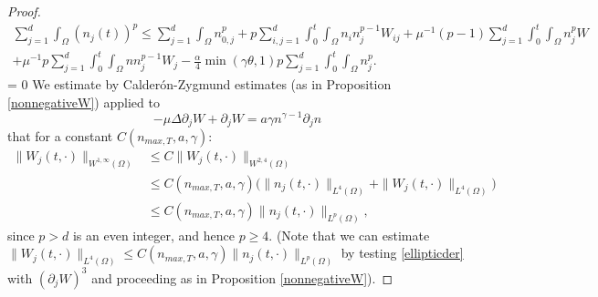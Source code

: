 \documentclass[12pt]{article}
\theoremstyle{plain}
\begin{document}
\begin{proof}
\begin{multline}
\sum_{j = 1}^{d} \int_{\Omega} (n_{j}(t))^{p} \le \sum_{j = 1}^{d} \int_{\Omega} n_{0, j}^{p} + p \sum_{i, j = 1}^{d} \int_{0}^{t} \int_{\Omega} n_{i}n_{j}^{p - 1} W_{ij} + \mu^{-1}(p - 1) \sum_{j = 1}^{d} \int_{0}^{t} \int_{\Omega} n_{j}^{p}W \\
+ \mu^{-1} p \sum_{j = 1}^{d} \int_{0}^{t} \int_{\Omega} nn_{j}^{p - 1} W_{j} - \frac{\alpha}{4} \min(\gamma \theta, 1) p \sum_{j = 1}^{d} \int_{0}^{t} \int_{\Omega} n_{j}^{p}.
\end{multline}
 = 0
We estimate by Calder\'{o}n-Zygmund estimates (as in Proposition \ref{nonnegativeW}) applied to
\begin{equation}\label{ellipticder}
-\mu \Delta \partial_{j}W + \partial_{j}W = a\gamma n^{\gamma - 1} \partial_{j}n
\end{equation}
that for a constant $C(n_{max, T}, a, \gamma)$:
\begin{align}\label{Wjestimate}
\|W_{j}(t, \cdot)\|_{W^{1, \infty}(\Omega)} &\le C\|W_{j}(t, \cdot)\|_{W^{2, 4}(\Omega)} \nonumber \\
&\le C(n_{max, T}, a, \gamma) \Big(\|n_{j}(t, \cdot)\|_{L^{4}(\Omega)} + \|W_{j}(t, \cdot)\|_{L^{4}(\Omega)}\Big) \nonumber \\
&\le C(n_{max, T}, a, \gamma)\|n_{j}(t, \cdot)\|_{L^{p}(\Omega)},
\end{align}
since $p > d$ is an even integer, and hence $p \ge 4$. (Note that we can estimate $\|W_{j}(t, \cdot)\|_{L^{4}(\Omega)} \le C(n_{max, T}, a, \gamma) \|n_{j}(t, \cdot)\|_{L^{p}(\Omega)}$ by testing \eqref{ellipticder} with $(\partial_{j}W)^{3}$ and proceeding as in Proposition \ref{nonnegativeW}).
\fi


\end{proof}
\end{document}
